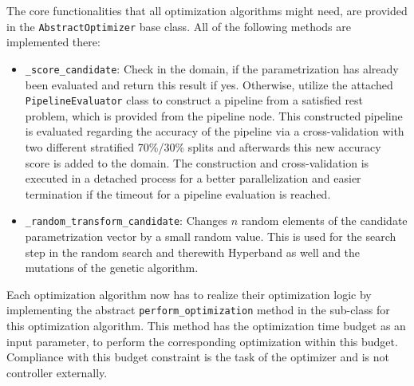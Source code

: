 The core functionalities that all optimization algorithms might need, are provided in the \texttt{AbstractOptimizer} base class.
All of the following methods are implemented there:
\begin{itemize}
    \item \texttt{\_score\_candidate}: Check in the domain, if the parametrization has already been evaluated and return this result if yes.
    Otherwise, utilize the attached \texttt{PipelineEvaluator} class to construct a pipeline from a satisfied rest problem, which is provided from the pipeline node.
    This constructed pipeline is evaluated regarding the accuracy of the pipeline via a cross-validation with two different stratified 70\%/30\% splits and afterwards this new accuracy score is added to the domain.
    The construction and cross-validation is executed in a detached process for a better parallelization and easier termination if the timeout for a pipeline evaluation is reached.
    \item \texttt{\_random\_transform\_candidate}: Changes $n$ random elements of the candidate parametrization vector by a small random value.
    This is used for the search step in the random search and therewith Hyperband as well and the mutations of the genetic algorithm.
\end{itemize}
Each optimization algorithm now has to realize their optimization logic by implementing the abstract \texttt{perform\_optimization} method in the sub-class for this optimization algorithm.
This method has the optimization time budget as an input parameter, to perform the corresponding optimization within this budget.
Compliance with this budget constraint is the task of the optimizer and is not controller externally.

